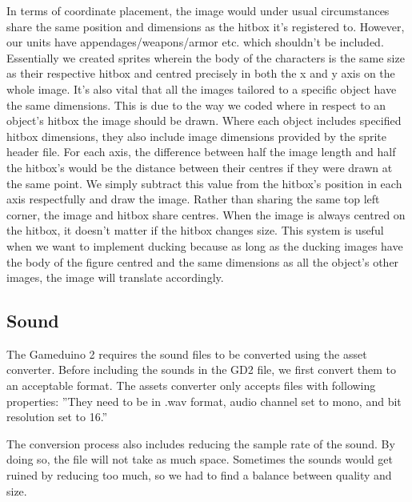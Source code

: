 In terms of coordinate placement, the image would under usual circumstances share the same position and dimensions as the hitbox it’s registered to. However, our units have appendages/weapons/armor etc. which shouldn’t be included. Essentially we created sprites wherein the body of the characters is the same size as their respective hitbox and centred precisely in both the x and y axis on the whole image. It’s also vital that all the images tailored to a specific object have the same dimensions. This is due to the way we coded where in respect to an object’s hitbox the image should be drawn. Where each object includes specified hitbox dimensions, they also include image dimensions provided by the sprite header file. For each axis, the difference between half the image length and half the hitbox’s would be the distance between their centres if they were drawn at the same point. We simply subtract this value from the hitbox’s position in each axis respectfully and draw the image. Rather than sharing the same top left corner, the image and hitbox share centres.  When the image is always centred on the hitbox, it doesn’t matter if the hitbox changes size. This system is useful when we want to implement ducking because as long as the ducking images have the body of the figure centred and the same dimensions as all the object’s other images, the image will translate accordingly.


\subsection*{Sound}
The Gameduino 2 requires the sound files to be converted using the asset converter. Before including the
sounds in the GD2 file, we first convert them to an acceptable format. The assets converter only accepts
files with following properties: 
''They need to be in .wav format, audio channel set to mono, and bit resolution set to 16.''

The conversion process also includes reducing the sample rate of the sound. By doing so,
the file will not take as much space. Sometimes the sounds would get ruined by reducing too much,
so we had to find a balance between quality and size.


